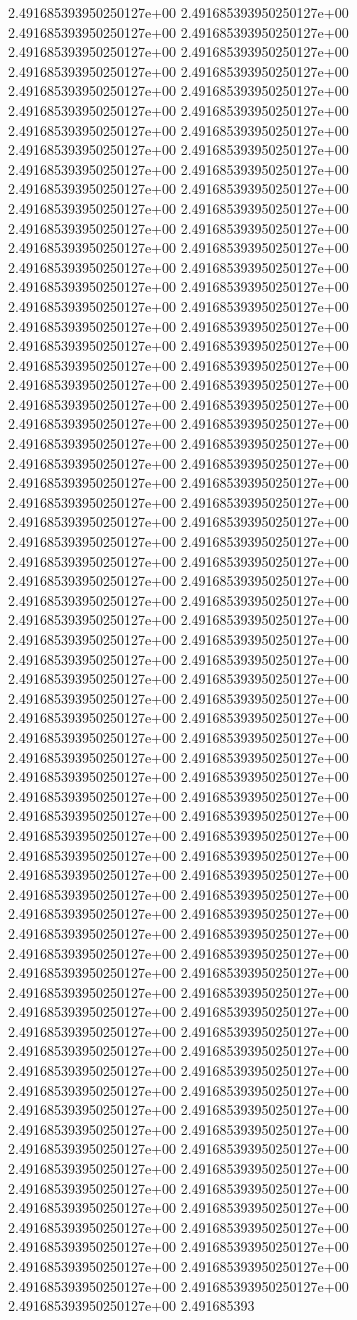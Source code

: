 2.491685393950250127e+00	2.491685393950250127e+00	2.491685393950250127e+00	2.491685393950250127e+00	2.491685393950250127e+00	2.491685393950250127e+00	2.491685393950250127e+00	2.491685393950250127e+00	2.491685393950250127e+00	2.491685393950250127e+00	2.491685393950250127e+00	2.491685393950250127e+00	2.491685393950250127e+00	2.491685393950250127e+00	2.491685393950250127e+00	2.491685393950250127e+00	2.491685393950250127e+00	2.491685393950250127e+00	2.491685393950250127e+00	2.491685393950250127e+00	2.491685393950250127e+00	2.491685393950250127e+00	2.491685393950250127e+00	2.491685393950250127e+00	2.491685393950250127e+00	2.491685393950250127e+00	2.491685393950250127e+00	2.491685393950250127e+00	2.491685393950250127e+00	2.491685393950250127e+00	2.491685393950250127e+00	2.491685393950250127e+00	2.491685393950250127e+00	2.491685393950250127e+00	2.491685393950250127e+00	2.491685393950250127e+00	2.491685393950250127e+00	2.491685393950250127e+00	2.491685393950250127e+00	2.491685393950250127e+00	2.491685393950250127e+00	2.491685393950250127e+00	2.491685393950250127e+00	2.491685393950250127e+00	2.491685393950250127e+00	2.491685393950250127e+00	2.491685393950250127e+00	2.491685393950250127e+00	2.491685393950250127e+00	2.491685393950250127e+00	2.491685393950250127e+00	2.491685393950250127e+00	2.491685393950250127e+00	2.491685393950250127e+00	2.491685393950250127e+00	2.491685393950250127e+00	2.491685393950250127e+00	2.491685393950250127e+00	2.491685393950250127e+00	2.491685393950250127e+00	2.491685393950250127e+00	2.491685393950250127e+00	2.491685393950250127e+00	2.491685393950250127e+00	2.491685393950250127e+00	2.491685393950250127e+00	2.491685393950250127e+00	2.491685393950250127e+00	2.491685393950250127e+00	2.491685393950250127e+00	2.491685393950250127e+00	2.491685393950250127e+00	2.491685393950250127e+00	2.491685393950250127e+00	2.491685393950250127e+00	2.491685393950250127e+00	2.491685393950250127e+00	2.491685393950250127e+00	2.491685393950250127e+00	2.491685393950250127e+00	2.491685393950250127e+00	2.491685393950250127e+00	2.491685393950250127e+00	2.491685393950250127e+00	2.491685393950250127e+00	2.491685393950250127e+00	2.491685393950250127e+00	2.491685393950250127e+00	2.491685393950250127e+00	2.491685393950250127e+00	2.491685393950250127e+00	2.491685393950250127e+00	2.491685393950250127e+00	2.491685393950250127e+00	2.491685393950250127e+00	2.491685393950250127e+00	2.491685393950250127e+00	2.491685393950250127e+00	2.491685393950250127e+00	2.491685393950250127e+00	2.491685393950250127e+00	2.491685393950250127e+00	2.491685393950250127e+00	2.491685393950250127e+00	2.491685393950250127e+00	2.491685393950250127e+00	2.491685393950250127e+00	2.491685393950250127e+00	2.491685393950250127e+00	2.491685393950250127e+00	2.491685393950250127e+00	2.491685393950250127e+00	2.491685393950250127e+00	2.491685393950250127e+00	2.491685393950250127e+00	2.491685393950250127e+00	2.491685393950250127e+00	2.491685393950250127e+00	2.491685393950250127e+00	2.491685393950250127e+00	2.491685393950250127e+00	2.491685393950250127e+00	2.491685393950250127e+00	2.491685393950250127e+00	2.491685393950250127e+00	2.491685393950250127e+00	2.491685393950250127e+00	2.491685393950250127e+00	2.491685393950250127e+00	2.491685393950250127e+00	2.491685393950250127e+00	2.491685393950250127e+00	2.491685393950250127e+00	2.491685393